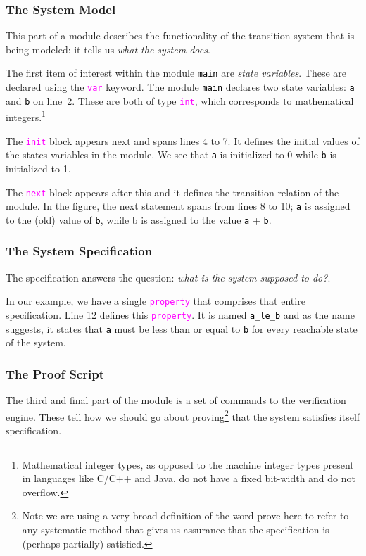 \documentclass{article}
\newcommand{\uclid}{{\sc{Uclid}}}
\newcommand{\keyword}[1]{\textcolor{magenta}{\texttt{#1}}}
\newcommand{\ident}[1]{\textcolor{black}{\texttt{#1}}}
\newcommand{\keywordbf}[1]{\textcolor{magenta}{\texttt{{#1}}}}
\begin{document}
\subsubsection{The System Model}
This part of a \uclid{} module describes the functionality of the transition system that is being modeled: it tells us \emph{what the system does}.

The first item of interest within the module \ident{main} are \emph{state variables}. These are declared using the \keywordbf{var} keyword. The module \ident{main} declares two state variables: \ident{a} and \ident{b} on line~2. These are both of type \keywordbf{int}, which corresponds to mathematical integers.\footnote{Mathematical integer types, as opposed to the machine integer types present in languages like C/C++ and Java, do not have a fixed bit-width and do not overflow.}

The \keywordbf{init} block appears next and spans lines 4 to 7. It defines the initial values of the states variables in the module. We see that \ident{a} is initialized to 0 while \ident{b} is initialized to 1.

The \keywordbf{next} block appears after this and it defines the transition relation of the module. In the figure, the next statement spans from lines 8 to 10; \ident{a} is assigned to the (old) value of \ident{b}, while b is assigned to the value \ident{a} + \ident{b}.

\subsubsection{The System Specification}
The specification answers the question: \emph{what is the system supposed to do?}. 

In our example, we have a single \keywordbf{property} that comprises that entire specification. Line 12 defines this \keyword{property}. It is named \ident{a\_le\_b} and as the name suggests, it states that \ident{a} must be less than or equal to \ident{b} for every reachable state of the system.

\subsubsection{The Proof Script}
The third and final part of the \uclid{} module is a set of commands to the \uclid{} verification engine. These tell how we should go about proving\footnote{Note we are using a very broad definition of the word prove here to refer to any systematic method that gives us assurance that the specification is (perhaps partially) satisfied.} that the system satisfies itself specification.
\end{document}
